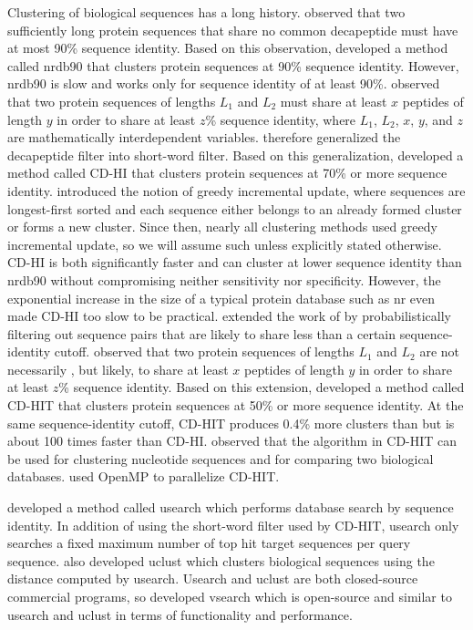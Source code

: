 \documentclass[]{article}
\begin{document}
Clustering of biological sequences has a long history.
\cite{holm1998removing} observed that two sufficiently long protein sequences that share no common decapeptide must have at most 90\% sequence identity.
Based on this observation, \cite{holm1998removing} developed a method called nrdb90 that clusters protein sequences at 90\% sequence identity.
However, nrdb90 is slow and works only for sequence identity of at least 90\%.
\cite{li2001clustering} observed that two protein sequences of lengths \(L_1\) and \(L_2\) must share at least \(x\) peptides of length \(y\) in order to share at least \(z\)\% sequence identity, 
	where \(L_1\), \(L_2\), \(x\), \(y\), and \(z\) are mathematically interdependent variables.
\cite{li2001clustering} therefore generalized the decapeptide filter into short-word filter.
Based on this generalization, \cite{li2001clustering} developed a method called CD-HI that clusters protein sequences at 70\% or more sequence identity.
\cite{li2001clustering} introduced the notion of greedy incremental update, where sequences are longest-first sorted and each sequence either belongs to an already formed cluster or forms a new cluster. 
Since then, nearly all clustering methods used greedy incremental update, so we will assume such unless explicitly stated otherwise.
CD-HI is both significantly faster and can cluster at lower sequence identity than nrdb90 without compromising neither sensitivity nor specificity.
However, the exponential increase in the size of a typical protein database such as nr even made CD-HI too slow to be practical.
\cite{li2002tolerating} extended the work of \cite{li2001clustering} by probabilistically filtering out sequence pairs that are likely to share less than a certain sequence-identity cutoff.
\cite{li2002tolerating} observed that two protein sequences of lengths \(L_1\) and \(L_2\) are not necessarily , but likely, to share at least \(x\) peptides of length \(y\) in order to share at least \(z\)\% sequence identity.
Based on this extension, \cite{li2002tolerating} developed a method called CD-HIT that clusters protein sequences at 50\% or more sequence identity. 
At the same sequence-identity cutoff, CD-HIT produces 0.4\% more clusters than but is about 100 times faster than CD-HI.
\cite{li2006cd} observed that the algorithm in CD-HIT can be used for clustering nucleotide sequences and for comparing two biological databases.
\cite{fu2012cd} used OpenMP to parallelize CD-HIT.

\cite{edgar2010search} developed a method called usearch which performs database search by sequence identity. 
In addition of using the short-word filter used by CD-HIT, usearch only searches a fixed maximum number of top hit target sequences per query sequence.  
\cite{edgar2010search} also developed uclust which clusters biological sequences using the distance computed by usearch.
Usearch and uclust are both closed-source commercial programs, so \cite{rognes2016vsearch} developed vsearch which is open-source and similar to usearch and uclust in terms of functionality and performance.
\end{document}
